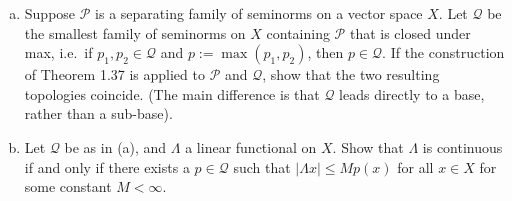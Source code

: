 \begin{exercise}[Ex.\ 1.8]
	\begin{enumerate}[(a)]
		\item Suppose $\mathscr{P}$ is a separating family of seminorms on a vector space $X$. Let $\mathscr{Q}$ be the smallest family of seminorms on $X$ containing $\mathscr{P}$ that is closed under max, i.e.\ if $p_1, p_2 \in \mathscr{Q}$ and $p := \max(p_1, p_2)$, then $p \in \mathscr{Q}$. If the construction of Theorem 1.37 is applied to $\mathscr{P}$ and $\mathscr{Q}$, show that the two resulting topologies coincide. (The main difference is that $\mathscr{Q}$ leads directly to a base, rather than a sub-base).
		
		\item Let $\mathscr{Q}$ be as in (a), and $\Lambda$ a linear functional on $X$. Show that $\Lambda$ is continuous if and only if there exists a $p \in \mathscr{Q}$ such that $|\Lambda x| \le M p(x)$ for all $x \in X$ for some constant $M < \infty$.
	\end{enumerate}
\end{exercise}